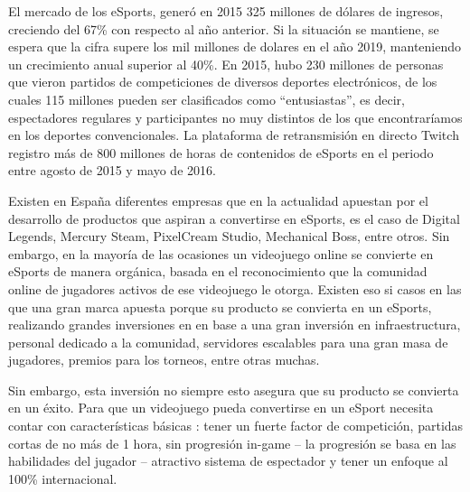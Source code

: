 El mercado de los eSports, generó en 2015 325 millones de dólares de ingresos, creciendo del 67\% con respecto al año anterior. Si la situación se mantiene, se espera que la cifra supere los mil millones de dolares en el año 2019, manteniendo un crecimiento anual superior al 40\%. En 2015, hubo 230 millones de personas que vieron partidos de competiciones de diversos deportes electrónicos, de los cuales 115 millones pueden ser clasificados como “entusiastas”, es decir, espectadores regulares y participantes no muy distintos de los que encontraríamos en los deportes convencionales. La plataforma de retransmisión en directo Twitch registro más de 800 millones de horas de contenidos de eSports en el periodo entre agosto de 2015 y mayo de 2016.

Existen en España diferentes empresas que en la actualidad apuestan por el desarrollo de productos que aspiran a convertirse en eSports, es el caso de Digital Legends, Mercury Steam, PixelCream Studio, Mechanical Boss, entre otros. Sin embargo, en la mayoría de las ocasiones un videojuego online se convierte en eSports de manera orgánica, basada en el reconocimiento que la comunidad online de jugadores activos de ese videojuego le otorga. Existen eso si casos en las que una gran marca apuesta porque su producto se convierta en un eSports, realizando grandes inversiones en en base a una gran inversión en infraestructura, personal dedicado a la comunidad, servidores escalables para una gran masa de jugadores, premios para los torneos, entre otras muchas. 

Sin embargo, esta inversión no siempre esto asegura que su producto se convierta en un éxito. Para que un videojuego pueda convertirse en un eSport necesita contar con características básicas : tener un fuerte factor de competición, partidas cortas de no más de 1 hora, sin progresión in-game – la progresión se basa en las habilidades del jugador – atractivo sistema de espectador y tener un enfoque al 100\% internacional.

